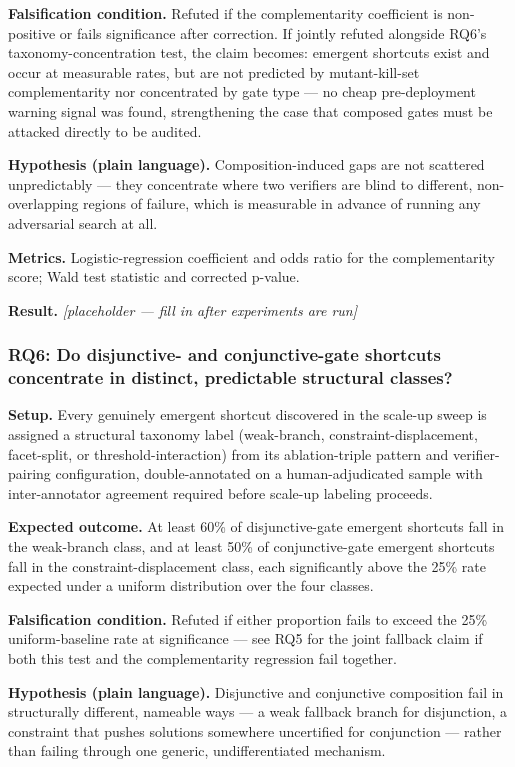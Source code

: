 \documentclass[11pt]{article}
\newcommand{\ph}{\textit{[placeholder --- fill in after experiments are run]}}
\begin{document}
\textbf{Falsification condition.} Refuted if the complementarity coefficient is non-positive or fails significance after correction. If jointly refuted alongside RQ6's taxonomy-concentration test, the claim becomes: emergent shortcuts exist and occur at measurable rates, but are not predicted by mutant-kill-set complementarity nor concentrated by gate type --- no cheap pre-deployment warning signal was found, strengthening the case that composed gates must be attacked directly to be audited.

\textbf{Hypothesis (plain language).} Composition-induced gaps are not scattered unpredictably --- they concentrate where two verifiers are blind to different, non-overlapping regions of failure, which is measurable in advance of running any adversarial search at all.

\textbf{Metrics.} Logistic-regression coefficient and odds ratio for the complementarity score; Wald test statistic and corrected p-value.

\textbf{Result.} \ph

\subsubsection{RQ6: Do disjunctive- and conjunctive-gate shortcuts concentrate in distinct, predictable structural classes?}
\textbf{Setup.} Every genuinely emergent shortcut discovered in the scale-up sweep is assigned a structural taxonomy label (weak-branch, constraint-displacement, facet-split, or threshold-interaction) from its ablation-triple pattern and verifier-pairing configuration, double-annotated on a human-adjudicated sample with inter-annotator agreement required before scale-up labeling proceeds.

\textbf{Expected outcome.} At least 60\% of disjunctive-gate emergent shortcuts fall in the weak-branch class, and at least 50\% of conjunctive-gate emergent shortcuts fall in the constraint-displacement class, each significantly above the 25\% rate expected under a uniform distribution over the four classes.

\textbf{Falsification condition.} Refuted if either proportion fails to exceed the 25\% uniform-baseline rate at significance --- see RQ5 for the joint fallback claim if both this test and the complementarity regression fail together.

\textbf{Hypothesis (plain language).} Disjunctive and conjunctive composition fail in structurally different, nameable ways --- a weak fallback branch for disjunction, a constraint that pushes solutions somewhere uncertified for conjunction --- rather than failing through one generic, undifferentiated mechanism.
\end{document}
